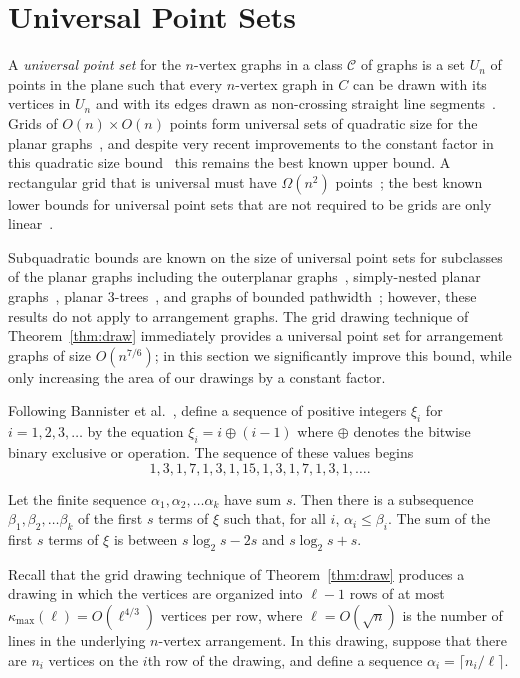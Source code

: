 \documentclass[oribibl]{llncs}
\newcommand{\maxklevel}{\kappa_{\max}}
\begin{document}
\section{Universal Point Sets}

A \emph{universal point set} for the $n$-vertex graphs in a class $\mathcal C$ of graphs is a set $U_n$ of points in the plane such that every $n$-vertex graph in $C$ can be drawn with its vertices in $U_n$ and with its edges drawn as non-crossing straight line segments~\cite{ChrKar-SN-89}.
Grids of $O(n)\times O(n)$ points form universal sets of quadratic size for the planar graphs~\cite{FraPacPol-STOC-88,Sch-SODA-90}, and despite very recent improvements to the constant factor in this quadratic size bound~\cite{BanCheDev-13} this remains the best known upper bound. A rectangular grid that is universal must have $\Omega(n^2)$ points~\cite{DolLeiTri-ACR-84,Val-TC-81}; the best known lower bounds for universal point sets that are not required to be grids are only linear~\cite{ChrKar-SN-89}.

Subquadratic bounds are known on the size of universal point sets for subclasses of the planar graphs including the outerplanar graphs~\cite{GriMohPol-AMM-1991}, simply-nested planar graphs~\cite{AngDibKau-GD-2012,BanCheDev-13}, planar 3-trees~\cite{FulTot-WADS-2013}, and graphs of bounded pathwidth~\cite{BanCheDev-13}; however, these results do not apply to arrangement graphs. The grid drawing technique of Theorem~\ref{thm:draw} immediately provides a universal point set for arrangement graphs of size $O(n^{7/6})$; in this section we significantly improve this bound, while only increasing the area of our drawings by a constant factor.

Following Bannister et al.~\cite{BanCheDev-13}, define a sequence of positive integers $\xi_i$ for $i=1,2,3,\dots$ by the equation $\xi_i=i\oplus(i-1)$ where $\oplus$ denotes the bitwise binary exclusive or operation. The sequence of these values begins
$$1,3,1,7,1,3,1,15,1,3,1,7,1,3,1,\dots.$$

\begin{lemma}
\label{lem:sawtooth}
Let the finite sequence $\alpha_1,\alpha_2,\dots \alpha_k$ have sum $s$. Then there is a subsequence $\beta_1,\beta_2,\dots \beta_k$ of the first $s$ terms of $\xi$ such that, for all $i$, $\alpha_i\le \beta_i$. The sum of the first $s$ terms of $\xi$ is between $s\log_2 s-2s$ and $s\log_2 s+s$.
\end{lemma}

Recall that the grid drawing technique of Theorem~\ref{thm:draw} produces a drawing in which the vertices are organized into $\ell-1$ rows of at most $\maxklevel(\ell)=O(\ell^{4/3})$ vertices per row, where $\ell=O(\sqrt n)$ is the number of lines in the underlying $n$-vertex arrangement. In this drawing, suppose that there are $n_i$ vertices on the $i$th row of the drawing, and define a sequence $\alpha_i=\lceil n_i/\ell\rceil$.
\end{document}
